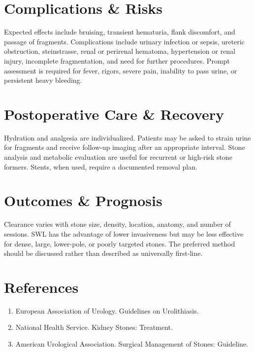 \section*{Complications \& Risks}
Expected effects include bruising, transient hematuria, flank discomfort, and passage of fragments. Complications include urinary infection or sepsis, ureteric obstruction, steinstrasse, renal or perirenal hematoma, hypertension or renal injury, incomplete fragmentation, and need for further procedures. Prompt assessment is required for fever, rigors, severe pain, inability to pass urine, or persistent heavy bleeding.

\section*{Postoperative Care \& Recovery}
Hydration and analgesia are individualized. Patients may be asked to strain urine for fragments and receive follow-up imaging after an appropriate interval. Stone analysis and metabolic evaluation are useful for recurrent or high-risk stone formers. Stents, when used, require a documented removal plan.

\section*{Outcomes \& Prognosis}
Clearance varies with stone size, density, location, anatomy, and number of sessions. SWL has the advantage of lower invasiveness but may be less effective for dense, large, lower-pole, or poorly targeted stones. The preferred method should be discussed rather than described as universally first-line.

\section*{References}
\begin{enumerate}
  \item European Association of Urology. Guidelines on Urolithiasis.
  \item National Health Service. Kidney Stones: Treatment.
  \item American Urological Association. Surgical Management of Stones: Guideline.
\end{enumerate}

\clearpage

